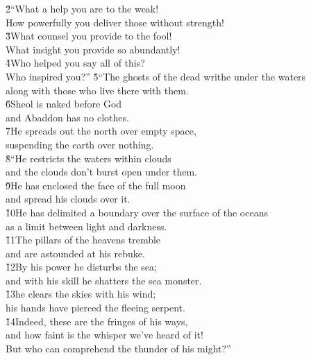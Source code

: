 \begin{poetry}
\poeml \v{2}``What a help you are to the weak! \\
\poemll    How powerfully you deliver those without strength! \\
\poeml \v{3}What counsel you provide to the fool! \\
\poemll    What insight you provide so abundantly! \\
\poeml \v{4}Who helped you say all of this? \\
\poemll    Who inspired you?''
\poeml \v{5}``The ghosts of the dead writhe under the waters \\
\poemll    along with those who live there with them. \\
\poeml \v{6}Sheol is naked before God \\
\poemll    and Abaddon has no clothes. \\
\poeml \v{7}He spreads out the north over empty space, \\
\poemll    suspending the earth over nothing. \\
\poeml \v{8}``He restricts the waters within clouds \\
\poemll    and the clouds don't burst open under them. \\
\poeml \v{9}He has enclosed the face of the full moon \\
\poemll    and spread his clouds over it. \\
\poeml \v{10}He has delimited a boundary over the surface of the oceans \\
\poemll    as a limit between light and darkness. \\
\poeml \v{11}The pillars of the heavens tremble \\
\poemll    and are astounded at his rebuke. \\
\poeml \v{12}By his power he disturbs the sea; \\
\poemll    and with his skill he shatters the sea monster. \\
\poeml \v{13}he clears the skies with his wind; \\
\poemll    his hands have pierced the fleeing serpent. \\
\poeml \v{14}Indeed, these are the fringes of his ways, \\
\poemll    and how faint is the whisper we've heard of it! \\
\poemlll       But who can comprehend the thunder of his might?''
\end{poetry}

